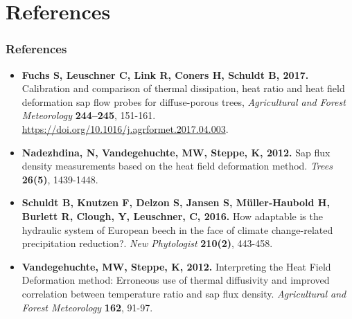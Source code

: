 \documentclass[usepdftitle=false]{beamer}
\newenvironment{changemargin}[2]{%
	\begin{list}{}{%
			\setlength{\topsep}{0pt}%
			\setlength{\leftmargin}{#1}%
			\setlength{\rightmargin}{#2}%
			\setlength{\listparindent}{\parindent}%
			\setlength{\itemindent}{\parindent}%
			\setlength{\parsep}{\parskip}%
		}%
		\item[]}
	{\end{list}
}
\begin{document}
{
	\begin{frame}[plain]
	\end{frame}
}

\section{References}
\begin{frame}[t]
	\frametitle{References}
	\begin{changemargin}{-2em}{-2em}
		\footnotesize
		\begin{itemize}
			\item \textbf{Fuchs S, Leuschner C, Link R, Coners H, Schuldt B, 2017.}
			Calibration and comparison of thermal dissipation, heat ratio and heat field deformation sap flow probes for diffuse-porous trees,
			\textit{Agricultural and Forest Meteorology} \textbf{244–245}, 151-161. \url{https://doi.org/10.1016/j.agrformet.2017.04.003}.
			\item \textbf{Nadezhdina, N, Vandegehuchte, MW, Steppe, K, 2012.} Sap flux density measurements based on the heat field deformation method. \textit{Trees} \textbf{26(5)}, 1439-1448.
			\item \textbf{Schuldt B, Knutzen F, Delzon S, Jansen S, Müller-Haubold H, Burlett R, Clough, Y, Leuschner, C, 2016.} How adaptable is the hydraulic system of European beech in the face of climate change-related precipitation reduction?. \textit{New Phytologist} \textbf{210(2)}, 443-458.
			\item \textbf{Vandegehuchte, MW,  Steppe, K, 2012.} Interpreting the Heat Field Deformation method: Erroneous use of thermal diffusivity and improved correlation between temperature ratio and sap flux density. \textit{Agricultural and Forest Meteorology} \textbf{162}, 91-97.
		\end{itemize}
	\end{changemargin}
\end{frame}
\end{document}
